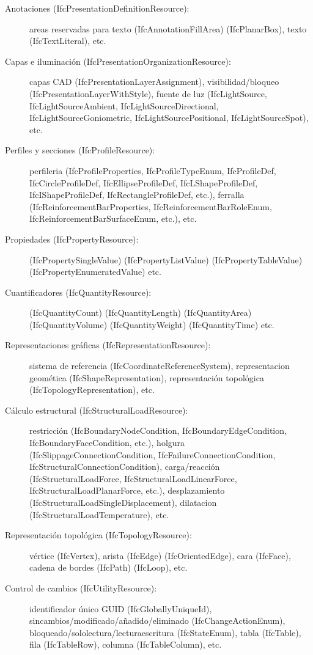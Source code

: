 \documentclass[spanish,12pt,a4paper,final,oneside]{book}
\begin{document}
\begin{description}
\item[Anotaciones (IfcPresentationDefinitionResource):] areas reservadas para texto (IfcAnnotationFillArea) (IfcPlanarBox), texto (IfcTextLiteral), etc.

\item[Capas e iluminación (IfcPresentationOrganizationResource):] capas CAD (IfcPresentationLayerAssignment), visibilidad/bloqueo (IfcPresentationLayerWithStyle), fuente de luz (IfcLightSource, IfcLightSourceAmbient, IfcLightSourceDirectional, IfcLightSourceGoniometric, IfcLightSourcePositional, IfcLightSourceSpot), etc.   

\item[Perfiles y secciones (IfcProfileResource):] perfileria (IfcProfileProperties, IfcProfileTypeEnum, IfcProfileDef, IfcCircleProfileDef, IfcEllipseProfileDef, IfcLShapeProfileDef, IfcIShapeProfileDef, IfcRectangleProfileDef, etc.), ferralla (IfcReinforcementBarProperties, IfcReinforcementBarRoleEnum, IfcReinforcementBarSurfaceEnum, etc.), etc.

\item[Propiedades (IfcPropertyResource):] (IfcPropertySingleValue) (IfcPropertyListValue) (IfcPropertyTableValue) (IfcPropertyEnumeratedValue) etc. 

\item[Cuantificadores (IfcQuantityResource):] (IfcQuantityCount) (IfcQuantityLength) (IfcQuantityArea) (IfcQuantityVolume) (IfcQuantityWeight) (IfcQuantityTime) etc.

\item[Representaciones gráficas (IfcRepresentationResource):] sistema de referencia (IfcCoordinateReferenceSystem), representacion geomética (IfcShapeRepresentation), representación topológica (IfcTopologyRepresentation), etc. 

\item[Cálculo estructural (IfcStructuralLoadResource):] restricción (IfcBoundaryNodeCondition, IfcBoundaryEdgeCondition, IfcBoundaryFaceCondition, etc.), holgura (IfcSlippageConnectionCondition, IfcFailureConnectionCondition, IfcStructuralConnectionCondition), carga/reacción (IfcStructuralLoadForce, IfcStructuralLoadLinearForce, IfcStructuralLoadPlanarForce, etc.), desplazamiento (IfcStructuralLoadSingleDisplacement), dilatacion (IfcStructuralLoadTemperature), etc. 

\item[Representación topológica (IfcTopologyResource):] vértice (IfcVertex), arista (IfcEdge) (IfcOrientedEdge), cara (IfcFace), cadena de bordes (IfcPath) (IfcLoop), etc.

\item[Control de cambios (IfcUtilityResource):] identificador único GUID (IfcGloballyUniqueId), sincambios/modificado/añadido/eliminado (IfcChangeActionEnum), bloqueado/sololectura/lecturaescritura (IfcStateEnum), tabla (IfcTable), fila (IfcTableRow), columna (IfcTableColumn), etc.

\end{description}
\end{document}
